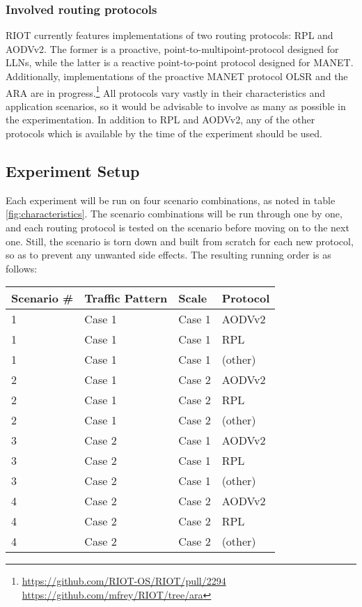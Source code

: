 \documentclass{acm_proc_article-sp}
\begin{document}
\subsubsection{Involved routing protocols}
\label{subsec:protocols}
RIOT currently features implementations of two routing protocols: RPL\cite{RFC-6550} and AODVv2\cite{draft-ietf-manet-aodvv2-09}. The former is a proactive, point-to-multipoint-protocol designed for \glspl{LLN}, while the latter is a reactive point-to-point protocol designed for \gls{MANET}. Additionally, implementations of the proactive \gls{MANET} protocol OLSR\cite{RFC-3626} and the \gls{ARA}\cite{ara} are in progress.\footnote{ \url{https://github.com/RIOT-OS/RIOT/pull/2294}\\  \url{https://github.com/mfrey/RIOT/tree/ara}}
All protocols vary vastly in their characteristics and application scenarios, so it would be advisable to involve as many as possible in the experimentation. In addition to RPL and AODVv2, any of the other protocols which is available by the time of the experiment should be used.

\subsection{Experiment Setup}
\label{subsec:setup}
Each experiment will be run on four scenario combinations, as noted in table \ref{fig:characteristics}. The scenario combinations will be run through one by one, and each routing protocol is tested on the scenario before moving on to the next one. Still, the scenario is torn down and built from scratch for each new protocol, so as to prevent any unwanted side effects. The resulting running order is as follows:

\begin{tabularx}{\linewidth}{l | X | l | X }
  Scenario \# & Traffic Pattern & Scale & Protocol \\
  \hline
  1 & Case 1 & Case 1 & AODVv2\\
  1 & Case 1 & Case 1 & RPL\\
  1 & Case 1 & Case 1 & (other)\\
  \hline
  2 & Case 1 & Case 2 & AODVv2\\
  2 & Case 1 & Case 2 & RPL\\
  2 & Case 1 & Case 2 & (other)\\
  \hline
  3 & Case 2 & Case 1 & AODVv2\\
  3 & Case 2 & Case 1 & RPL\\
  3 & Case 2 & Case 1 & (other)\\
  \hline
  4 & Case 2 & Case 2 & AODVv2\\
  4 & Case 2 & Case 2 & RPL\\
  4 & Case 2 & Case 2 & (other)\\
\end{tabularx}
\end{document}
